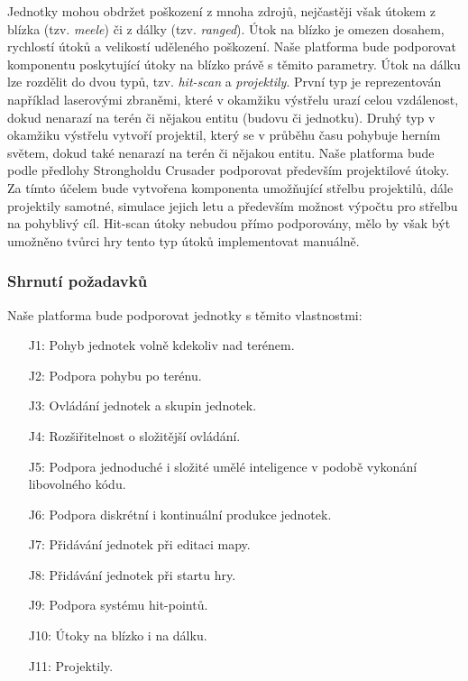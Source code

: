 Jednotky mohou obdržet poškození z mnoha zdrojů, nejčastěji však útokem z blízka (tzv. \textit{meele}) či z dálky (tzv. \textit{ranged}). Útok na blízko je omezen dosahem, rychlostí útoků a velikostí uděleného poškození. Naše platforma bude podporovat komponentu poskytující útoky na blízko právě s těmito parametry. Útok na dálku lze rozdělit do dvou typů, tzv. \textit{hit-scan} a \textit{projektily}. První typ je reprezentován například laserovými zbraněmi, které v okamžiku výstřelu urazí celou vzdálenost, dokud nenarazí na terén či nějakou entitu (budovu či jednotku). Druhý typ v okamžiku výstřelu vytvoří projektil, který se v průběhu času pohybuje herním světem, dokud také nenarazí na terén či nějakou entitu. Naše platforma bude podle předlohy Strongholdu Crusader podporovat především projektilové útoky. Za tímto účelem bude vytvořena komponenta umožňující střelbu projektilů, dále projektily samotné, simulace jejich letu a především možnost výpočtu pro střelbu na pohyblivý cíl. Hit-scan útoky nebudou přímo podporovány, mělo by však být umožněno tvůrci hry tento typ útoků implementovat manuálně.

\subsubsection{Shrnutí požadavků}
Naše platforma bude podporovat jednotky s těmito vlastnostmi:
\begin{itemize}
	\item[J1:] Pohyb jednotek volně kdekoliv nad terénem.
	\item[J2:] Podpora pohybu po terénu.
	\item[J3:] Ovládání jednotek a skupin jednotek.
	\item[J4:] Rozšiřitelnost o složitější ovládání.
	\item[J5:] Podpora jednoduché i složité umělé inteligence v podobě vykonání libovolného kódu.
	\item[J6:] Podpora diskrétní i kontinuální produkce jednotek.
	\item[J7:] Přidávání jednotek při editaci mapy.
	\item[J8:] Přidávání jednotek při startu hry.
	\item[J9:] Podpora systému hit-pointů.
	\item[J10:] Útoky na blízko i na dálku.
	\item[J11:] Projektily.
\end{itemize}

\done
{}
